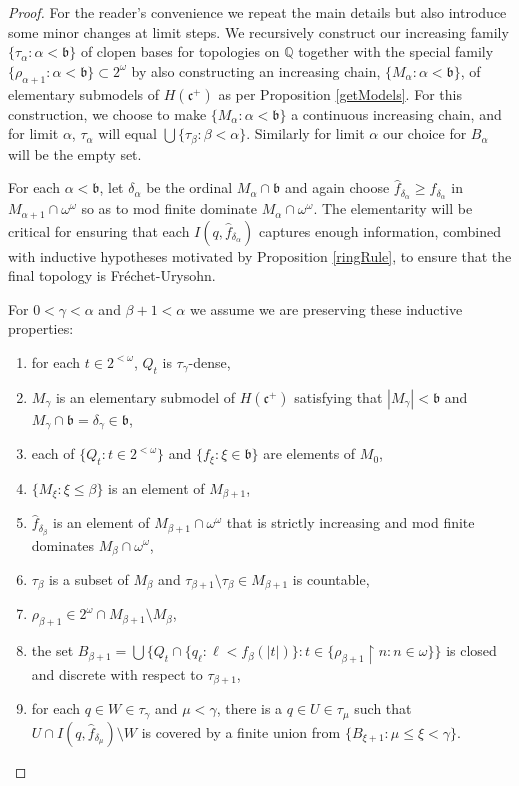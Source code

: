 \documentclass{amsart}
\theoremstyle{definition}
\theoremstyle{remark}
\begin{document}
\begin{proof} For the reader's convenience we repeat
the main details but also introduce some minor changes at limit steps.
We recursively  construct
our  increasing family $\{ \tau_\alpha : \alpha < \mathfrak b\}$
of clopen bases for topologies on $\mathbb Q$ together with 
the special  family
 $\{ \rho_{\alpha+1} : \alpha < \mathfrak b\}
 \subset 2^\omega$ 
 by also constructing an increasing chain,
  $\{ M_\alpha : \alpha < \mathfrak b\}$,
 of elementary
 submodels of $H(\mathfrak c^+)$ as per Proposition \ref{getModels}.
 For this construction, we choose to make $\{ M_\alpha :\alpha <\mathfrak b\}$
  a continuous increasing chain,  and for limit $\alpha$,
    $\tau_\alpha $ will equal $\bigcup\{ \tau_\beta : \beta < \alpha\}$. 
Similarly for limit $\alpha$ our choice for $B_\alpha$ will be the empty set.

 For each $\alpha <\mathfrak b$,  
  let $\delta_\alpha$ be the ordinal
    $M_\alpha\cap \mathfrak b$  and again choose $\hat f_{\delta_\alpha}
    \geq f_{\delta_\alpha}$
    in $M_{\alpha+1}\cap \omega^\omega$ so as to 
    mod finite dominate $M_\alpha\cap \omega^\omega$.
  The elementarity will be
    critical for ensuring that each $I(q,\hat f_{\delta_\alpha})$ 
    captures enough information,
    combined with inductive hypotheses motivated by
    Proposition \ref{ringRule},
    to ensure that the final
    topology is Fr\'echet-Urysohn.

For $0<\gamma  < \alpha$
 and $\beta+1 < \alpha$ we assume we are preserving
these inductive properties:
   
\begin{enumerate}
\item for each $t\in 2^{<\omega}$, $Q_t$ is $\tau_{\gamma}$-dense,
\item $M_\gamma$ is an elementary submodel  of $H(\mathfrak c^+)$
satisfying that $|M_\gamma|<\mathfrak b$ and $M_\gamma\cap \mathfrak b = 
 \delta_\gamma\in \mathfrak b$,
 \item each of $ \{Q_t:t\in 2^{<\omega}\}$ and $\{f_\xi: \xi\in\mathfrak b\}$
  are elements of $M_0$,
\item  $\{ M_\xi : \xi\leq \beta\}$ is an  element  of $M_{\beta+1}$,
\item $\hat f_{\delta_\beta}$ is an element of $M_{\beta+1}\cap \omega^\omega$
that is strictly increasing and mod finite dominates $M_\beta\cap \omega^\omega$,
\item   $\tau_\beta$ is a subset of $M_\beta$  and $\tau_{\beta+1}\setminus \tau_\beta\in M_{\beta+1}$ is countable,
\item $\rho_{\beta+1}\in 2^\omega\cap M_{\beta+1} \setminus M_\beta $,
 \item the\label{H3} set $B_{\beta+1} = \bigcup\{ Q_t \cap \{ q_\ell : \ell < f_{\beta}(|t|) \}: 
  t\in \{ \rho_{\beta+1}\restriction n : n\in \omega\}\}$
is closed and discrete with respect to 
$\tau_{\beta+1}$,
 \item for\label{mH1} each $q\in W\in \tau_\gamma$ and $\mu<\gamma$, there is a
 $q\in U\in \tau_\mu$
 such that $ U\cap I(q,\hat f_{\delta_\mu}) \setminus W$ is 
 covered by a finite union from $\{ B_{\xi+1} : \mu \leq \xi < \gamma\}$.
\end{enumerate}


\end{proof}
\end{document}
